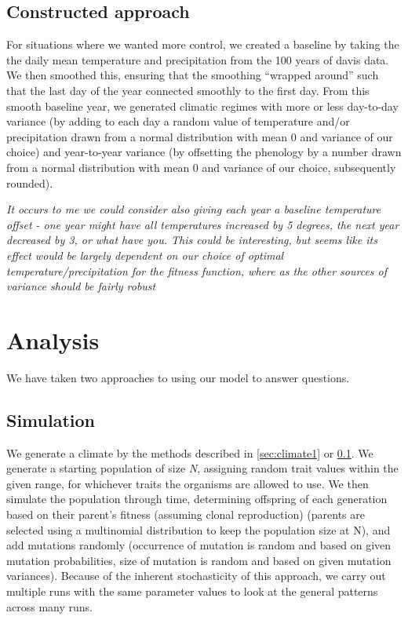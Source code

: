 \documentclass[11pt,a4paper]{article}
\begin{document}
\subsection{Constructed approach}\label{sec:climate2}
For situations where we wanted more control, we created a baseline by taking the the daily mean temperature and precipitation from the 100 years of davis data. We then smoothed this, ensuring that the smoothing ``wrapped around'' such that the last day of the year connected smoothly to the first day. From this smooth baseline year, we generated climatic regimes with more or less day-to-day variance (by adding to each day a random value of temperature and/or precipitation drawn from a normal distribution with mean 0 and variance of our choice) and year-to-year variance (by offsetting the phenology by a number drawn from a normal distribution with mean 0 and variance of our choice, subsequently rounded). 

\textit{It occurs to me we could consider also giving each year a baseline temperature offset - one year might have all temperatures increased by 5 degrees, the next year decreased by 3, or what have you. This could be interesting, but seems like its effect would be largely dependent on our choice of optimal temperature/precipitation for the fitness function, where as the other sources of variance should be fairly robust}

\section{Analysis}
We have taken two approaches to using our model to answer questions.

\subsection{Simulation}
We generate a climate by the methods described in \ref{sec:climate1} or \ref{sec:climate2}. We generate a starting population of size \textit{N}, assigning random trait values within the given range, for whichever traits the organisms are allowed to use. We then simulate the population through time, determining offspring of each generation based on their parent's fitness (assuming clonal reproduction) (parents are selected using a multinomial distribution to keep the population size at N), and add mutations randomly (occurrence of mutation is random and based on given mutation probabilities, size of mutation is random and based on given mutation variances). Because of the inherent stochasticity of this approach, we carry out multiple runs with the same parameter values to look at the general patterns across many runs.
\end{document}
